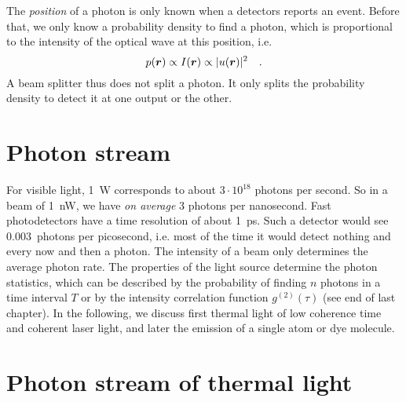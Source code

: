 The \emph{position} of a photon is only known when a detectors reports an event. Before that, we only know a probability density to find a photon, which is proportional to the intensity of the optical wave at this position, i.e.
\begin{equation}
    p(\boldsymbol{r}) \propto I(\boldsymbol{r})  \propto | u(\boldsymbol{r}) |^2 \quad .
\end{equation}
A beam splitter thus does not split a photon. It only splits the probability density to detect it at one output or the other.


\section{Photon stream}

For visible light, 1~W corresponds to about $3 \cdot 10^{18}$ photons per second. So in a beam of 1~nW, we have \emph{on average} 3 photons per nanosecond. Fast photodetectors have a time resolution of about 1~ps. Such a detector would see 0.003~photons per picosecond, i.e. most of the time it would detect nothing and every now and then a photon. The intensity of a beam only determines the average photon rate. The properties of the light source determine the photon statistics, which can be described by the probability of finding $n$ photons in a time interval $T$ or by the intensity correlation function $g^{(2)}(\tau)$ (see end of last chapter). In the following, we discuss first thermal light of low coherence time and coherent laser light, and later the emission of a single atom or dye molecule.

\section{Photon stream of thermal light}

